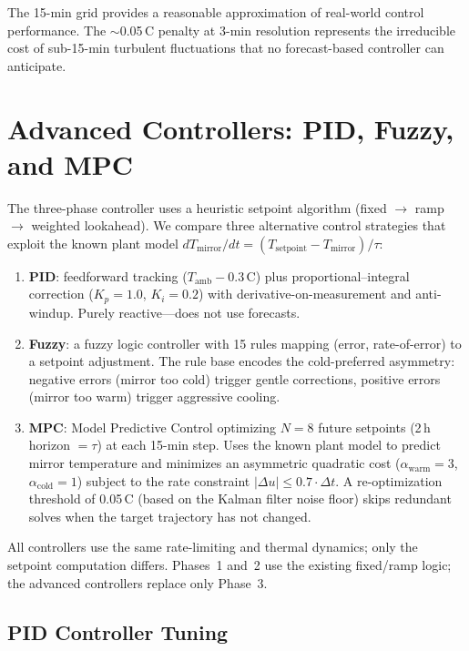 \documentclass[11pt]{article}
\begin{document}
The 15-min grid provides a reasonable approximation of real-world control
performance.  The $\sim$0.05\,\textdegree C penalty at 3-min resolution
represents the irreducible cost of sub-15-min turbulent fluctuations that
no forecast-based controller can anticipate.

\section{Advanced Controllers: PID, Fuzzy, and MPC}
\label{sec:controllers}

The three-phase controller uses a heuristic setpoint algorithm (fixed $\to$
ramp $\to$ weighted lookahead).  We compare three alternative control
strategies that exploit the known plant model
$dT_\mathrm{mirror}/dt = (T_\mathrm{setpoint} - T_\mathrm{mirror})/\tau$:

\begin{enumerate}
  \item \textbf{PID}: feedforward tracking ($T_\mathrm{amb} - 0.3$\,\textdegree C)
    plus proportional--integral correction ($K_p = 1.0$, $K_i = 0.2$) with
    derivative-on-measurement and anti-windup.  Purely reactive---does not
    use forecasts.
  \item \textbf{Fuzzy}: a fuzzy logic controller with 15 rules mapping
    (error, rate-of-error) to a setpoint adjustment.  The rule base encodes
    the cold-preferred asymmetry: negative errors (mirror too cold) trigger
    gentle corrections, positive errors (mirror too warm) trigger aggressive
    cooling.
  \item \textbf{MPC}: Model Predictive Control optimizing $N = 8$ future
    setpoints (2\,h horizon $= \tau$) at each 15-min step.  Uses the known
    plant model to predict mirror temperature and minimizes an asymmetric
    quadratic cost ($\alpha_\mathrm{warm} = 3$, $\alpha_\mathrm{cold} = 1$)
    subject to the rate constraint $|\Delta u| \leq 0.7 \cdot \Delta t$.
    A re-optimization threshold of 0.05\,\textdegree C (based on the Kalman
    filter noise floor) skips redundant solves when the target trajectory
    has not changed.
\end{enumerate}

All controllers use the same rate-limiting and thermal dynamics; only the
setpoint computation differs.  Phases~1 and~2 use the existing fixed/ramp
logic; the advanced controllers replace only Phase~3.

\subsection{PID Controller Tuning}
\end{document}
